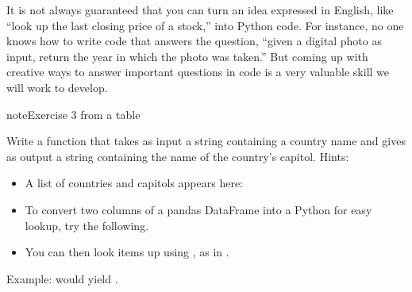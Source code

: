 \documentclass[letterpaper,10pt,english]{jupyterBook}
\begin{document}
\sphinxAtStartPar
It is not always guaranteed that you can turn an idea expressed in English, like “look up the last closing price of a stock,” into Python code.  For instance, no one knows how to write code that answers the question, “given a digital photo as input, return the year in which the photo was taken.”  But coming up with creative ways to answer important questions in code is a very valuable skill we will work to develop.

\begin{sphinxadmonition}{note}{Exercise 3 \sphinxhyphen{} from a table}

\sphinxAtStartPar
Write a function  that takes as input a string containing a country name and gives as output a string containing the name of the country’s capitol.  Hints:
\begin{itemize}
\item {} 
\sphinxAtStartPar
A list of countries and capitols appears here: 

\item {} 
\sphinxAtStartPar
To convert two columns of a pandas DataFrame into a Python  for easy lookup, try the following.

\end{itemize}

\begin{sphinxVerbatim}[commandchars=\\\{\}]
  \PYG{p}{[}\PYG{p}{]}
  \PYG{p}{[}\PYG{p}{]}
       
\end{sphinxVerbatim}
\begin{itemize}
\item {} 
\sphinxAtStartPar
You can then look items up using , as in .

\end{itemize}

\sphinxAtStartPar
Example:  would yield .
\end{sphinxadmonition}
\end{document}
